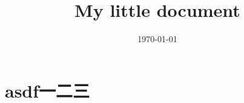 \documentclass[nofonts]{ctexart}
\date{\today}
\title{My little document}
\begin{document}
\maketitle
\tableofcontents


\section{asdf一二三}
\label{sec:orgheadline1}
\end{document}
